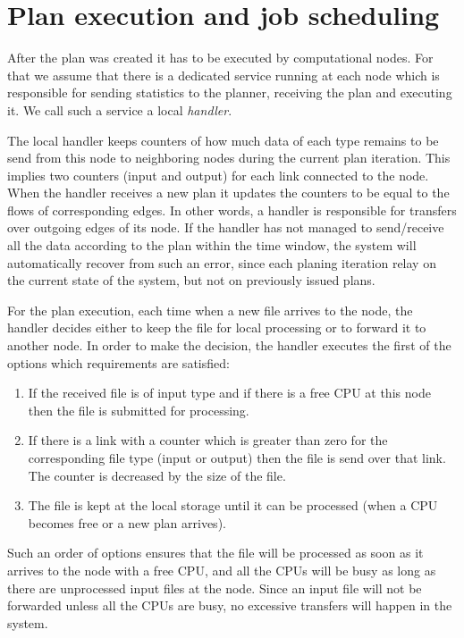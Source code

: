 \documentclass{svjour3}                     %
\begin{document}
\section{Plan execution and job scheduling}
\label{plan-execution}
After the plan was created it has to be executed by computational
nodes. For that we assume that there is a dedicated service running at each node
which is responsible for sending statistics to the planner, receiving the plan and executing it. We call such a service a local \textit{handler}.

The local handler keeps counters of how much data of each type remains to be send from this node to neighboring nodes during the current plan iteration. This implies two counters (input and output) for each link connected to the node. When the handler receives a new plan it updates the counters to be equal to the flows of corresponding edges. In other words, a handler is responsible for transfers over outgoing edges of its node. If the handler has not managed to send/receive all the data according to the plan within the time window, the system will automatically recover from such an error, since each planing iteration relay on the current state of the system, but not on previously issued plans.  

For the plan execution, each time when a new file arrives to the node, the handler decides either to keep the file for local processing or to forward it to another node. In order to make the decision, the handler executes the first of the options which requirements are satisfied:

\begin{enumerate}
\item If the received file is of input type and if there is a free CPU at this node then the file is submitted for processing.
\item If there is a link with a counter which is greater than zero for the corresponding file type (input or output) then the file is send over that link. The counter is decreased by the size of the file.
\item The file is kept at the local storage until it can be processed (when a CPU becomes free  or a new plan arrives).
\end{enumerate}
Such an order of options ensures that the file will be processed as soon as it arrives to the node with a free CPU, and all the CPUs will be busy as long as there are unprocessed input files at the node. Since an input file will not be forwarded unless all the CPUs are busy, no excessive transfers will happen in the system.
\end{document}
